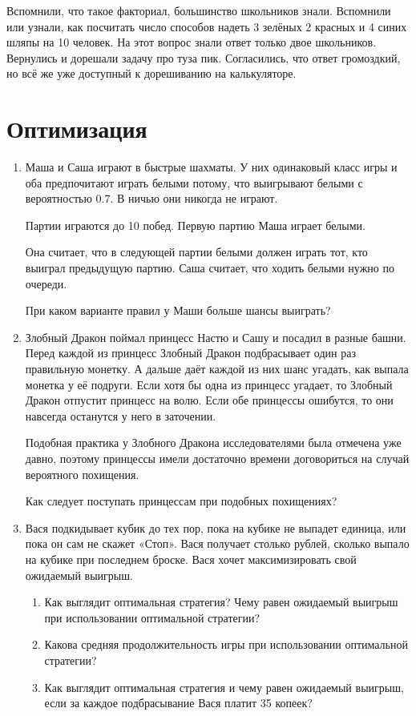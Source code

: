 \documentclass[12pt]{article}
\theoremstyle{definition}
\begin{document}
Вспомнили, что такое факториал, большинство школьников знали. 
Вспомнили или узнали, как посчитать число способов надеть 3 зелёных 2 красных и 4 синих шляпы на 10 человек. 
На этот вопрос знали ответ только двое школьников. Вернулись и дорешали задачу про туза пик. 
Согласились, что ответ громоздкий, но всё же уже доступный к дорешиванию на калькуляторе. 


\section{Оптимизация}

\newpage
\begin{enumerate}
  \item Маша и Саша играют в быстрые шахматы. У них одинаковый класс игры и
  оба предпочитают играть белыми потому, что выигрывают белыми с вероятностью $0.7$.
  В ничью они никогда не играют.

  Партии играются до 10 побед. Первую партию Маша играет белыми.
  
  Она считает, что в следующей партии белыми должен играть тот,
  кто выиграл предыдущую партию. Саша считает, что ходить белыми нужно по очереди.

  При каком варианте правил у Маши больше шансы выиграть?

  \item Злобный Дракон поймал принцесс Настю и Сашу и посадил в разные башни.
  Перед каждой из принцесс Злобный Дракон подбрасывает один раз правильную монетку.
  А дальше даёт каждой из них шанс угадать, как выпала монетка у её подруги.
  Если хотя бы одна из принцесс угадает, то Злобный Дракон отпустит принцесс на волю.
  Если обе принцессы ошибутся, то они навсегда останутся у него в заточении.
  
  Подобная практика у Злобного Дракона исследователями была отмечена уже давно,
  поэтому принцессы имели достаточно времени договориться на случай вероятного похищения.
  
  Как следует поступать принцессам при подобных похищениях?

  \item Вася подкидывает кубик до тех пор, пока на кубике не выпадет единица, или пока он сам не скажет «Стоп». 
  Вася получает столько рублей, сколько выпало на кубике при последнем броске. 
  Вася хочет максимизировать свой ожидаемый выигрыш.
  \begin{enumerate}
  \item Как выглядит оптимальная стратегия? Чему равен ожидаемый выигрыш при использовании оптимальной стратегии?
  \item Какова средняя продолжительность игры при использовании оптимальной стратегии?
  \item Как выглядит оптимальная стратегия и чему равен ожидаемый выигрыш, если за каждое
  подбрасывание Вася платит 35 копеек?
  \end{enumerate}


\end{enumerate}
\end{document}
